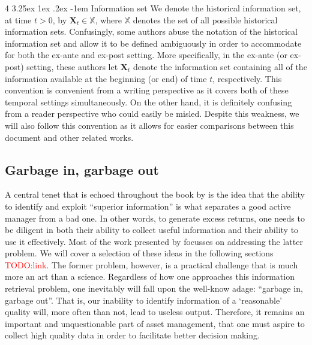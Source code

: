 \documentclass[12pt]{article}
\makeatletter
\renewcommand\paragraph{%
	\@startsection{paragraph}
	{4}
	{\z@}
	{3.25ex \@plus1ex \@minus.2ex}
	{-1em}
	{\normalfont\normalsize\bfseries\maybe@addperiod}%
}
\newcommand{\maybe@addperiod}[1]{%
	#1\@addpunct{.}%
}
\makeatother
\begin{document}
\paragraph{Information set} We denote the historical information set, at time $t > 0$, by $\mathbf{X}_t \in \mathbb{X}$, where $\mathbb{X}$ denotes the set of all possible historical information sets. Confusingly, some authors abuse the notation of the historical information set and allow it to be defined ambiguously in order to accommodate for both the ex-ante and ex-post setting. More specifically, in the ex-ante (or ex-post) setting, these authors let $\mathbf{X}_t$ denote the information set containing all of the information available at the beginning (or end) of time $t$, respectively. This convention is convenient from a writing perspective as it covers both of these temporal settings simultaneously. On the other hand, it is definitely confusing from a reader perspective who could easily be misled. Despite this weakness, we will also follow this convention as it allows for easier comparisons between this document and other related works.

\subsection{Garbage in, garbage out}
A central tenet that is echoed throughout the book by \cite{grinold1999} is the idea that the ability to identify and exploit ``superior information'' is what separates a good active manager from a bad one. In other words, to generate excess returns, one needs to be diligent in both their ability to collect useful information and their ability to use it effectively. Most of the work presented by \cite{grinold1999} focusses on addressing the latter problem. We will cover a selection of these ideas in the following sections \textcolor{red}{TODO:link}. The former problem, however, is a practical challenge that is much more an art than a science. Regardless of how one approaches this information retrieval problem, one inevitably will fall upon the well-know adage: ``garbage in, garbage out''. That is, our inability to identify information of a `reasonable' quality will, more often than not, lead to useless output. Therefore, it remains an important and unquestionable part of asset management, that one must aspire to collect high quality data in order to facilitate better decision making.

\end{document}
